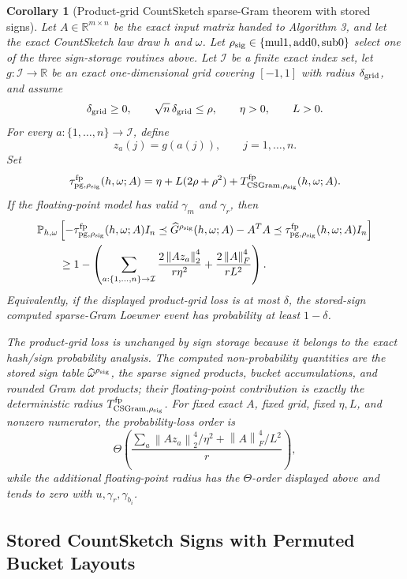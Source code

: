 \documentclass[11pt]{article}
\newcommand{\R}{\mathbb{R}}
\newcommand{\Prob}{\mathbb{P}}
\newcommand{\Frob}[1]{\left\lVert #1\right\rVert_F}
\newcommand{\Norm}[1]{\left\lVert #1\right\rVert_2}
\newcommand{\I}{I}
\newtheorem{corollary}[theorem]{Corollary}
\theoremstyle{remark}
\begin{document}
\begin{corollary}[Product-grid CountSketch sparse-Gram theorem with stored signs]
Let \(A\in\R^{m\times n}\) be the exact input matrix handed to Algorithm 3,
and let the exact CountSketch law draw \(h\) and \(\omega\).  Let
\(\rho_{\rm sig}\in\{\mathrm{mul1},\mathrm{add0},\mathrm{sub0}\}\) select one
of the three sign-storage routines above.  Let \(\mathcal I\) be a finite
exact index set, let \(g:\mathcal I\to\R\) be an exact one-dimensional grid
covering \([-1,1]\) with radius \(\delta_{\rm grid}\), and assume
\[
  \delta_{\rm grid}\ge0,\qquad
  \sqrt n\,\delta_{\rm grid}\le\rho,\qquad
  \eta>0,\qquad
  L>0 .
\]
For every \(a:\{1,\ldots,n\}\to\mathcal I\), define
\[
  z_a(j)=g(a(j)),\qquad j=1,\ldots,n .
\]
Set
\[
  \tau_{{\rm pg},\rho_{\rm sig}}^{\rm fp}(h,\omega;A)
  =
  \eta+L(2\rho+\rho^2)
  +
  T_{{\rm CSGram},\rho_{\rm sig}}^{\rm fp}(h,\omega;A).
\]
If the floating-point model has valid \(\gamma_m\) and \(\gamma_r\), then
\[
\begin{aligned}
&\Prob_{h,\omega}
  \left[
    -\tau_{{\rm pg},\rho_{\rm sig}}^{\rm fp}(h,\omega;A)\I_n
    \preceq
    \widehat G^{\rho_{\rm sig}}(h,\omega;A)-A^TA
    \preceq
    \tau_{{\rm pg},\rho_{\rm sig}}^{\rm fp}(h,\omega;A)\I_n
  \right]
\\
&\qquad\ge
  1-
  \left(
    \sum_{a:\{1,\ldots,n\}\to\mathcal I}
      \frac{2\Norm{Az_a}^4}{r\eta^2}
    +
      \frac{2\Frob{A}^4}{rL^2}
  \right).
\end{aligned}
\]
Equivalently, if the displayed product-grid loss is at most \(\delta\), the
stored-sign computed sparse-Gram Loewner event has probability at least
\(1-\delta\).

The product-grid loss is unchanged by sign storage because it belongs to the
exact hash/sign probability analysis.  The computed non-probability quantities
are the stored sign table \(\widehat\omega^{\rho_{\rm sig}}\), the sparse
signed products, bucket accumulations, and rounded Gram dot products; their
floating-point contribution is exactly the deterministic radius
\(T_{{\rm CSGram},\rho_{\rm sig}}^{\rm fp}\).  For fixed exact \(A\), fixed
grid, fixed \(\eta,L\), and nonzero numerator, the probability-loss order is
\[
  \Theta\!\left(
    \frac{
      \sum_a\Norm{Az_a}^4/\eta^2+\Frob{A}^4/L^2
    }{r}
  \right),
\]
while the additional floating-point radius has the \(\Theta\)-order displayed
above and tends to zero with \(u,\gamma_r,\gamma_{b_i}\).
\end{corollary}

\subsection*{Stored CountSketch Signs with Permuted Bucket Layouts}
\end{document}
